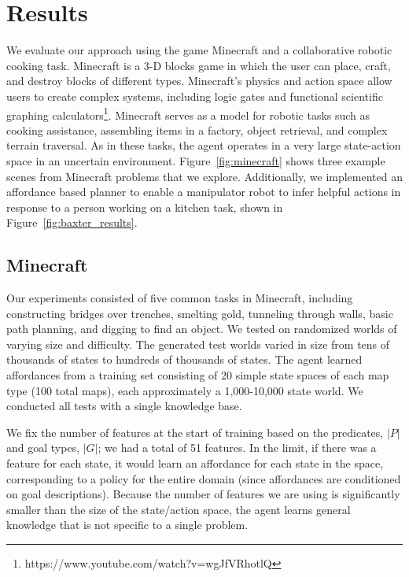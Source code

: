 \documentclass[letterpaper]{article}
\begin{document}
\section{Results}
\label{sec:results}


We evaluate our approach using the game Minecraft and a collaborative
robotic cooking task.  Minecraft is a 3-D blocks game in which the
user can place, craft, and destroy blocks of different types.
Minecraft's physics and action space allow users to create complex
systems, including logic gates and functional scientific graphing
calculators\footnote{https://www.youtube.com/watch?v=wgJfVRhotlQ}.
Minecraft serves as a model for robotic tasks such as cooking
assistance, assembling items in a factory, object retrieval, and
complex terrain traversal.  As in these tasks, the agent operates in a
very large state-action space in an uncertain environment.
Figure~\ref{fig:minecraft} shows three example scenes from Minecraft
problems that we explore.  Additionally, we implemented an affordance based planner to
enable a manipulator robot to infer helpful actions in response to a
person working on a kitchen task, shown in Figure~\ref{fig:baxter_results}.

\subsection{Minecraft}

Our experiments consisted of five common tasks in Minecraft, including
constructing bridges over trenches, smelting gold, tunneling through
walls, basic path planning, and digging to find an object.  We tested
on randomized worlds of varying size and difficulty. The generated
test worlds varied in size from tens of thousands of states to
hundreds of thousands of states.  The agent learned affordances from a
training set consisting of 20 simple state spaces of each map type
(100 total maps), each approximately a 1,000-10,000 state world. We
conducted all tests with a single knowledge base.  

We fix the number of features at the start of training based on the
predicates, $|P|$ and goal types, $|G|$; we had a total of 51
features.  In the limit, if there was a feature for each state, it
would learn an affordance for each state in the space, corresponding
to a policy for the entire domain (since affordances are conditioned
on goal descriptions).  Because the number of features we are using is
significantly smaller than the size of the state/action space, the
agent learns general knowledge that is not specific to a single
problem.   
\end{document}
